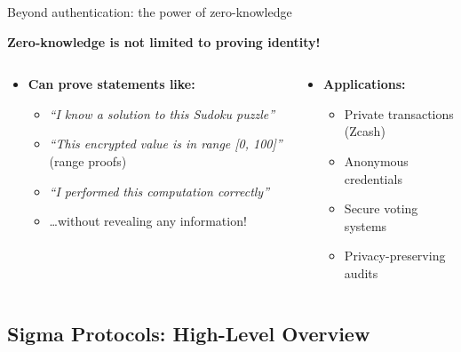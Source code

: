\documentclass[aspectratio=169, lualatex, handout]{beamer}
\begin{document}
\begin{frame}{Beyond authentication: the power of zero-knowledge}
	\begin{center}
		\textbf{Zero-knowledge is not limited to proving identity!}
	\end{center}
	\vspace{0.25em}
	\begin{columns}[c]
		\begin{column}{0.6\textwidth}
			\begin{itemize}
				\item \textbf{Can prove statements like:}
				      \begin{itemize}
					      \item \textit{``I know a solution to this Sudoku puzzle''}
					      \item \textit{``This encrypted value is in range [0, 100]''} (range proofs)
					      \item \textit{``I performed this computation correctly''}
					      \item \ldots without revealing any information!
				      \end{itemize}
			\end{itemize}
		\end{column}
		\begin{column}{0.4\textwidth}
			\begin{itemize}
				\item \textbf{Applications:}
				      \begin{itemize}
					      \item Private transactions (Zcash)
					      \item Anonymous credentials
					      \item Secure voting systems
					      \item Privacy-preserving audits
				      \end{itemize}
			\end{itemize}
		\end{column}
	\end{columns}
\end{frame}

\subsection{Sigma Protocols: High-Level Overview}
\end{document}
